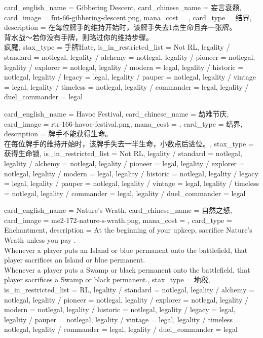 \documentclass[lang = cn, color = black, 10pt]{AllThatStax}
\begin{document}
\card
{
	card_english_name = {Gibbering Descent},
	card_chinese_name = {妄言衰颓},
	card_image = fut-66-gibbering-descent.png,
	mana_cost = ,
	card_type = 结界,
	description = {在每位牌手的维持开始时，该牌手失去1点生命且弃一张牌。\\
		背水战～若你没有手牌，则略过你的维持步骤。\\
		疯魔},
	stax_type = 手牌Hate,
	is_in_restricted_list = Not RL,
	legality / standard = notlegal,
	legality / alchemy = notlegal,
	legality / pioneer = notlegal,
	legality / explorer = notlegal,
	legality / modern = legal,
	legality / historic = notlegal,
	legality / legacy = legal,
	legality / pauper = notlegal,
	legality / vintage = legal,
	legality / timeless = notlegal,
	legality / commander = legal,
	legality / duel_commander = legal
}

\card
{
	card_english_name = {Havoc Festival},
	card_chinese_name = {劫难节庆},
	card_image = rtr-166-havoc-festival.png,
	mana_cost = ,
	card_type = 结界,
	description = {牌手不能获得生命。\\
		在每位牌手的维持开始时，该牌手失去一半生命，小数点后进位。},
	stax_type = 获得生命锁,
	is_in_restricted_list = Not RL,
	legality / standard = notlegal,
	legality / alchemy = notlegal,
	legality / pioneer = legal,
	legality / explorer = notlegal,
	legality / modern = legal,
	legality / historic = notlegal,
	legality / legacy = legal,
	legality / pauper = notlegal,
	legality / vintage = legal,
	legality / timeless = notlegal,
	legality / commander = legal,
	legality / duel_commander = legal
}

\card
{
	card_english_name = {Nature's Wrath},
	card_chinese_name = {自然之怒},
	card_image = me2-172-nature-s-wrath.png,
	mana_cost = ,
	card_type = Enchantment,
	description = {At the beginning of your upkeep, sacrifice Nature's Wrath unless you pay .\\
		Whenever a player puts an Island or blue permanent onto the battlefield, that player sacrifices an Island or blue permanent.\\
		Whenever a player puts a Swamp or black permanent onto the battlefield, that player sacrifices a Swamp or black permanent.},
	stax_type = 地税,
	is_in_restricted_list = RL,
	legality / standard = notlegal,
	legality / alchemy = notlegal,
	legality / pioneer = notlegal,
	legality / explorer = notlegal,
	legality / modern = notlegal,
	legality / historic = notlegal,
	legality / legacy = legal,
	legality / pauper = notlegal,
	legality / vintage = legal,
	legality / timeless = notlegal,
	legality / commander = legal,
	legality / duel_commander = legal
}
\end{document}

